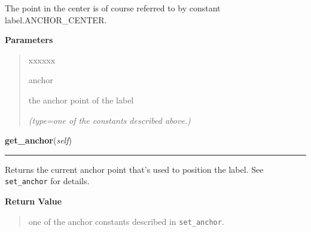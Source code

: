 \begin{boxedminipage}{\funcwidth}
    The point in the center is of course referred to by constant 
    label.ANCHOR\_CENTER.

\setlength{\parskip}{1ex}
      \textbf{Parameters}
      \vspace{-1ex}

      \begin{quote}
        \begin{Ventry}{xxxxxx}

          \item[anchor]

          the anchor point of the label

            {\it (type=one of the constants described above.)}

        \end{Ventry}

      \end{quote}

    \end{boxedminipage}

    \label{pygtk_chart:label:Label:get_anchor}

    \vspace{0.5ex}

\hspace{.8\funcindent}\begin{boxedminipage}{\funcwidth}

    \raggedright \textbf{get\_anchor}(\textit{self})

    \vspace{-1.5ex}

    \rule{\textwidth}{0.5\fboxrule}
\setlength{\parskip}{2ex}
    Returns the current anchor point that's used to position the label. See
    \texttt{set\_anchor} for details.

\setlength{\parskip}{1ex}
      \textbf{Return Value}
    \vspace{-1ex}

      \begin{quote}
      one of the anchor constants described in \texttt{set\_anchor}.

      \end{quote}

    \end{boxedminipage}

    \label{pygtk_chart:label:Label:set_underline}

